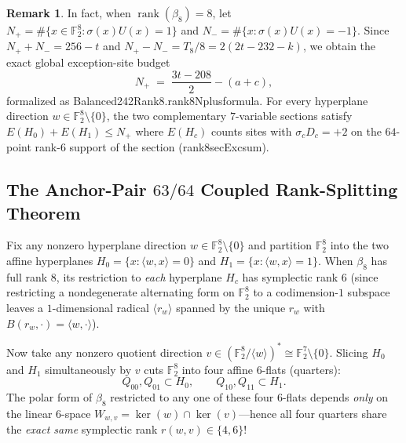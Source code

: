 \documentclass[11pt]{article}
\theoremstyle{definition}
\newtheorem{remark}[theorem]{Remark}
\newcommand{\F}{\mathbb{F}}
\newcommand{\rank}{\operatorname{rank}}
\newcommand{\code}[1]{{\ttfamily\small\renewcommand{\_}{\textunderscore\allowbreak}#1}}
\begin{document}
\begin{remark}
In fact, when $\rank(\beta_8) = 8$, let $N_+ = \#\{x \in \F_2^8 : \sigma(x)U(x) = 1\}$ and $N_- = \#\{x : \sigma(x)U(x) = -1\}$. Since $N_+ + N_- = 256 - t$ and $N_+ - N_- = T_8 / 8 = 2(2t - 232 - k)$, we obtain the exact global exception-site budget
\begin{equation}
\label{eq:Nplus}
  N_+ \;=\; \frac{3t - 208}{2} - (a + c),
\end{equation}
formalized as \code{Balanced242Rank8.rank8\_Nplus\_formula}.
For every hyperplane direction $w \in \F_2^8 \setminus \{0\}$, the two complementary $7$-variable sections satisfy $E(H_0) + E(H_1) \le N_+$ where $E(H_c)$ counts sites with $\sigma_c D_c = +2$ on the $64$-point rank-$6$ support of the section (\code{rank8\_secExc\_sum}).
\end{remark}

\subsection{The Anchor-Pair $63/64$ Coupled Rank-Splitting Theorem}

Fix any nonzero hyperplane direction $w \in \F_2^8 \setminus \{0\}$ and partition $\F_2^8$ into the two affine hyperplanes $H_0 = \{x : \langle w, x\rangle = 0\}$ and $H_1 = \{x : \langle w, x\rangle = 1\}$.
When $\beta_8$ has full rank $8$, its restriction to \emph{each} hyperplane $H_c$ has symplectic rank $6$ (since restricting a nondegenerate alternating form on $\F_2^8$ to a codimension-$1$ subspace leaves a $1$-dimensional radical $\langle r_w \rangle$ spanned by the unique $r_w$ with $B(r_w, \cdot) = \langle w, \cdot \rangle$).

Now take any nonzero quotient direction $v \in (\F_2^8 / \langle w \rangle)^* \cong \F_2^7 \setminus \{0\}$.
Slicing $H_0$ and $H_1$ simultaneously by $v$ cuts $\F_2^8$ into four affine $6$-flats (quarters):
\[
  Q_{00}, Q_{01} \subset H_0, \qquad Q_{10}, Q_{11} \subset H_1.
\]
The polar form of $\beta_8$ restricted to any one of these four $6$-flats depends \emph{only} on the linear $6$-space $W_{w,v} = \ker(w) \cap \ker(v)$---hence all four quarters share the \emph{exact same} symplectic rank $r(w, v) \in \{4, 6\}$!
\end{document}
